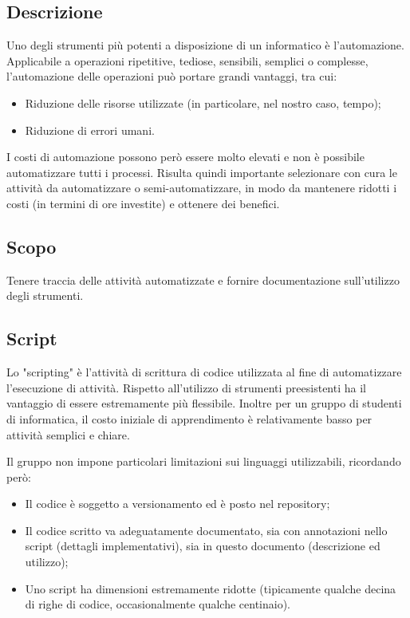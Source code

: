 \subsection{Descrizione}
Uno degli strumenti più potenti a disposizione di un informatico è l'automazione. Applicabile a operazioni ripetitive, tediose, sensibili, semplici o complesse, l'automazione delle operazioni può portare grandi vantaggi, tra cui:
\begin{itemize}
    \item Riduzione delle risorse utilizzate (in particolare, nel nostro caso, tempo);
    \item Riduzione di errori umani.
\end{itemize}
I costi di automazione possono però essere molto elevati e non è possibile automatizzare tutti i processi. Risulta quindi importante selezionare con cura le attività da automatizzare o semi-automatizzare, in modo da mantenere ridotti i costi (in termini di ore investite) e ottenere dei benefici.

\subsection{Scopo}
Tenere traccia delle attività automatizzate e fornire documentazione sull'utilizzo degli strumenti.

\subsection{Script}
Lo "scripting" è l'attività di scrittura di codice utilizzata al fine di automatizzare l'esecuzione di attività. Rispetto all'utilizzo di strumenti preesistenti ha il vantaggio di essere estremamente più flessibile. Inoltre per un gruppo di studenti di informatica, il costo iniziale di apprendimento è relativamente basso per attività semplici e chiare.

Il gruppo non impone particolari limitazioni sui linguaggi utilizzabili, ricordando però:
\begin{itemize}
    \item Il codice è soggetto a versionamento ed è posto nel repository;
    \item Il codice scritto va adeguatamente documentato, sia con annotazioni nello script (dettagli implementativi), sia in questo documento (descrizione ed utilizzo);
    \item Uno script ha dimensioni estremamente ridotte (tipicamente qualche decina di righe di codice, occasionalmente qualche centinaio).
\end{itemize}


